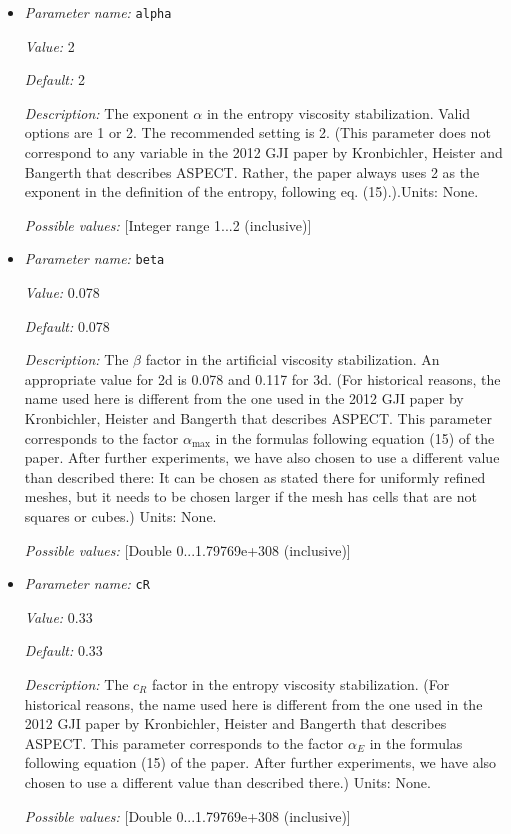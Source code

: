 \begin{itemize}
\item {\it Parameter name:} {\tt alpha}
\label{parameters:Discretization/Stabilization parameters/alpha}


{\it Value:} 2


{\it Default:} 2


{\it Description:} The exponent $\alpha$ in the entropy viscosity stabilization. Valid options are 1 or 2. The recommended setting is 2. (This parameter does not correspond to any variable in the 2012 GJI paper by Kronbichler, Heister and Bangerth that describes ASPECT. Rather, the paper always uses 2 as the exponent in the definition of the entropy, following eq. (15).).Units: None.


{\it Possible values:} [Integer range 1...2 (inclusive)]
\item {\it Parameter name:} {\tt beta}
\label{parameters:Discretization/Stabilization parameters/beta}


{\it Value:} 0.078


{\it Default:} 0.078


{\it Description:} The $\beta$ factor in the artificial viscosity stabilization. An appropriate value for 2d is 0.078 and 0.117 for 3d. (For historical reasons, the name used here is different from the one used in the 2012 GJI paper by Kronbichler, Heister and Bangerth that describes ASPECT. This parameter corresponds to the factor $\alpha_\text {max}$ in the formulas following equation (15) of the paper. After further experiments, we have also chosen to use a different value than described there: It can be chosen as stated there for uniformly refined meshes, but it needs to be chosen larger if the mesh has cells that are not squares or cubes.) Units: None.


{\it Possible values:} [Double 0...1.79769e+308 (inclusive)]
\item {\it Parameter name:} {\tt cR}
\label{parameters:Discretization/Stabilization parameters/cR}


{\it Value:} 0.33


{\it Default:} 0.33


{\it Description:} The $c_R$ factor in the entropy viscosity stabilization. (For historical reasons, the name used here is different from the one used in the 2012 GJI paper by Kronbichler, Heister and Bangerth that describes ASPECT. This parameter corresponds to the factor $\alpha_E$ in the formulas following equation (15) of the paper. After further experiments, we have also chosen to use a different value than described there.) Units: None.


{\it Possible values:} [Double 0...1.79769e+308 (inclusive)]
\end{itemize}

